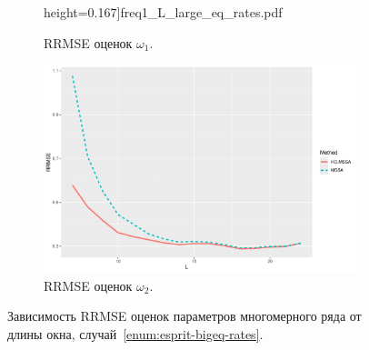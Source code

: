 \documentclass[specialist,
  substylefile=spbu_report.rtx,
subf,href,colorlinks=true, 12pt]{disser}
\theoremstyle{plain}
\theoremstyle{definition}
\theoremstyle{remark}
\begin{document}
\begin{figure}[!ht]
\begin{subfigure}{0.49\linewidth}
    height=0.167\textheight]{freq1_L_large_eq_rates.pdf}
    \caption{RRMSE оценок $\omega_1$.}
    \label{fig:freq1_L_large_eq_rates}
  \end{subfigure}
  \begin{subfigure}{0.49\linewidth}
    \includegraphics[width=\linewidth,
    height=0.167\textheight]{freq2_L_large_eq_rates.pdf}
    \caption{RRMSE оценок $\omega_2$.}
    \label{fig:freq2_L_large_eq_rates}
  \end{subfigure}
  \caption{Зависимость RRMSE оценок параметров многомерного ряда от
    длины окна,
  случай~\ref{enum:esprit-bigeq-rates}.}
  \label{fig:L_large_eq_rates}
\end{figure}
\end{document}
